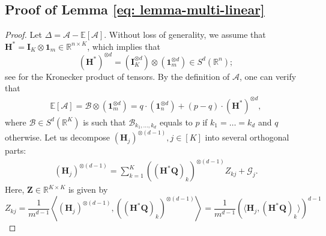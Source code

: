 \documentclass{article}
\theoremstyle{plain}
\theoremstyle{definition}
\theoremstyle{remark}
\newcommand{\Br}{\mathbb{R}}
\newcommand{\BE}{\mathbb{E}}
\newcommand{\BH}{\bm{H}}
\newcommand{\BQ}{\bm{Q}}
\newcommand{\BCal}{\mathcal{B}}
\newcommand{\GCal}{\mathcal{G}}
\newcommand{\ACal}{\mathcal{A}}
\def\b1{\bm{1}}
\begin{document}
\begin{appendix}
\begin{center}
		\section{Proof of Lemma \ref{eq: lemma-multi-linear}}
		\begin{proof}
			Let $\Delta = \ACal - \BE[\ACal]$. Without loss of generality, we assume that $\bm{H}^* = \bm{I}_K \otimes \b1_m \in \mathbb{R}^{n \times K}$, which implies that
			\begin{equation*}
				\left(\BH^* \right)^{\otimes d} = \left(\bm{I}_K ^{\otimes d}\right) \otimes \left(\b1_m^{\otimes d}\right) \in S^d(\Br^n);
			\end{equation*}
			see \citet[Section 2.1]{cichocki2016tensor} for the Kronecker product of tensors. 
			By the definition of $\ACal$, one can verify that
			\begin{align} \label{eq: eadecom}
				\BE[\ACal] 
				=  \BCal \otimes \left(\b1_m^{\otimes d} \right) = q\cdot \left(\b1_n^{\otimes d}\right) + (p-q)\cdot \left(\BH^* \right)^{\otimes d},
			\end{align}
			where $\BCal \in S^d(\Br^K)$ is such that $\BCal_{k_1,\dots,k_d}$ equals to $p$ if $k_1=\dots=k_d$ and $q$ otherwise. Let us decompose $(\bm{H}_j)^{\otimes(d-1)}, j\in [K]$ into several orthogonal parts:
			\begin{align} \label{eq: Horthdecom}
				(\bm{H}_j)^{\otimes(d-1)} = \sum_{k=1}^K ((\BH^* \BQ)_k)^{\otimes (d-1)} Z_{kj} + \GCal_j.
			\end{align}
			Here, $\bm{Z} \in \Br^{K \times K}$ is given by
			\begin{equation}\label{eq: Zexpression}
				Z_{kj} = \frac{1}{m^{d-1}} \left \langle (\bm{H}_j)^{\otimes(d-1)}, ((\BH^* \BQ)_k)^{\otimes (d-1)} \right\rangle = \frac{1}{m^{d-1}} \left ( \langle \BH_j, (\BH^* \BQ)_k \rangle \right)^{d-1}

\end{equation}
\end{proof}
\end{center}
\end{appendix}
\end{document}
